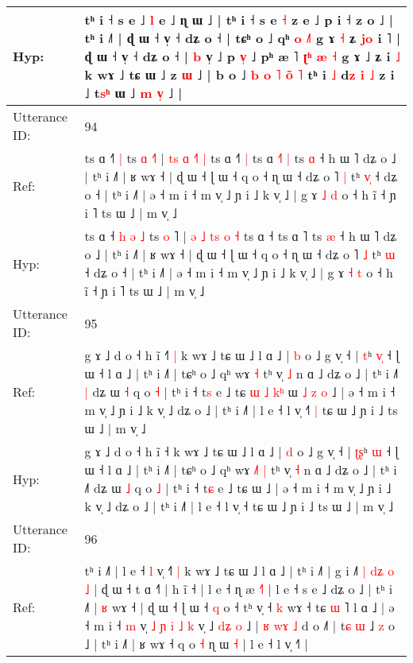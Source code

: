 \documentclass[10pt]{article}
\DeclareRobustCommand{\hl}[1]{{\textcolor{red}{#1}}}
\begin{document}
\begin{longtable}{ll}
 \\
Hyp: & tʰ i ˧ s e ˩ \hl{l} e ˩ ɳ ɯ ˩ | tʰ i ˧ s e \hl{˧} z e ˩\hl{}\hl{} p i ˧ z o ˩ | tʰ i ˩˥ | ɖ ɯ ˧ v̩ ˧ dʑ o ˧ | tɕʰ o ˩ qʰ \hl{}\hl{o} \hl{}\hl{˩}\hl{˥} g ɤ \hl{˧} ʑ\hl{ }\hl{j}\hl{o} i ˥ | ɖ ɯ ˧ v̩ ˧ dʑ o ˧ | \hl{b} v̩ ˩ p\hl{ }\hl{v}\hl{̩} ˩ pʰ æ ˥\hl{ }\hl{ʈ}\hl{ʰ}\hl{ }\hl{æ} \hl{˧} g ɤ ˩ ʑ i \hl{˩} k wɤ ˩ tɕ ɯ ˩ z \hl{ɯ} ˩ | b o ˩ \hl{b} \hl{o}\hl{ }\hl{˥} \hl{o}\hl{̃} \hl{˥} tʰ i \hl{˩} d\hl{z}\hl{ }\hl{i}\hl{ }\hl{˩}\hl{ }z i ˩ t\hl{s}\hl{ʰ} ɯ ˩ \hl{m} \hl{v}\hl{̩} ˩ |
 \\
\midrule
Utterance ID: & 94 \\
Ref: & ts ɑ ˧\hl{}\hl{}\hl{}\hl{˥} \hl{|} ts \hl{ɑ} \hl{˧}˥ | \hl{}\hl{t}\hl{s} \hl{ɑ}\hl{ }\hl{˧}\hl{˥} \hl{|} ts ɑ ˧\hl{˥}\hl{ }\hl{|} ts ɑ \hl{˧}˥\hl{ }\hl{|} ts \hl{ɑ} ˧ h ɯ ˥ dʑ o ˩ | tʰ i ˩˥ | ʁ wɤ ˧ | ɖ ɯ ˧ ɭ ɯ ˧ q o ˧ ɳ ɯ ˧ dʑ o ˥ \hl{|} tʰ \hl{v}\hl{̩} ˧ dʑ o ˧ | tʰ i ˩˥ | ə ˧ m i ˧ m v̩ ˩ ɲ i ˩ k v̩ ˩ | g ɤ \hl{˩} \hl{d} o ˧ h ĩ ˧ ɲ i ˥ ts ɯ ˩ | m v̩ ˩
 \\
Hyp: & ts ɑ ˧\hl{ }\hl{h}\hl{ }\hl{ə} \hl{˩} ts \hl{o} \hl{}˥ | \hl{ə}\hl{ }\hl{˩} \hl{t}\hl{s}\hl{ }\hl{o} \hl{˧} ts ɑ ˧\hl{}\hl{}\hl{} ts ɑ \hl{}˥\hl{}\hl{} ts \hl{æ} ˧ h ɯ ˥ dʑ o ˩ | tʰ i ˩˥ | ʁ wɤ ˧ | ɖ ɯ ˧ ɭ ɯ ˧ q o ˧ ɳ ɯ ˧ dʑ o ˥ \hl{˩} tʰ \hl{}\hl{ɯ} ˧ dʑ o ˧ | tʰ i ˩˥ | ə ˧ m i ˧ m v̩ ˩ ɲ i ˩ k v̩ ˩ | g ɤ \hl{˧} \hl{t} o ˧ h ĩ ˧ ɲ i ˥ ts ɯ ˩ | m v̩ ˩
 \\
\midrule
Utterance ID: & 95 \\
Ref: & g ɤ ˩ d o ˧ h ĩ ˧\hl{˥}\hl{ }\hl{|} k wɤ ˩ tɕ ɯ ˩ l ɑ ˩ | \hl{b} o ˩ g v̩ ˧ | \hl{}\hl{t}ʰ \hl{v}\hl{̩} ˧ ɭ ɯ ˧ l ɑ ˩ | tʰ i ˩˥ | tɕʰ o ˩ qʰ wɤ\hl{}\hl{}\hl{} \hl{˧} tʰ v̩ \hl{˩} n ɑ ˩ dʑ o ˩ | tʰ i ˩˥\hl{ }\hl{|} dʑ ɯ \hl{˧} q o \hl{˧} | tʰ i ˧ t\hl{s} e ˩ tɕ\hl{ }\hl{ɯ}\hl{ }\hl{˩}\hl{ }\hl{k}\hl{ʰ} ɯ\hl{ }\hl{˩}\hl{ }\hl{z}\hl{ }\hl{o} ˩ | ə ˧ m i ˧ m v̩ ˩ ɲ i ˩ k v̩ ˩ dʑ o ˩ | tʰ i ˩˥ | l e ˧ l v̩ ˧\hl{˥}\hl{ }\hl{|} tɕ ɯ ˩ ɲ i ˩ ts ɯ ˩ | m v̩ ˩
 \\
Hyp: & g ɤ ˩ d o ˧ h ĩ ˧\hl{}\hl{}\hl{} k wɤ ˩ tɕ ɯ ˩ l ɑ ˩ | \hl{d} o ˩ g v̩ ˧ | \hl{ʈ}\hl{ʂ}ʰ \hl{}\hl{ɯ} ˧ ɭ ɯ ˧ l ɑ ˩ | tʰ i ˩˥ | tɕʰ o ˩ qʰ wɤ\hl{ }\hl{˩}\hl{˥} \hl{|} tʰ v̩ \hl{˧} n ɑ ˩ dʑ o ˩ | tʰ i ˩˥\hl{}\hl{} dʑ ɯ \hl{˩} q o \hl{˩} | tʰ i ˧ t\hl{ɕ} e ˩ tɕ\hl{}\hl{}\hl{}\hl{}\hl{}\hl{}\hl{} ɯ\hl{}\hl{}\hl{}\hl{}\hl{}\hl{} ˩ | ə ˧ m i ˧ m v̩ ˩ ɲ i ˩ k v̩ ˩ dʑ o ˩ | tʰ i ˩˥ | l e ˧ l v̩ ˧\hl{}\hl{}\hl{} tɕ ɯ ˩ ɲ i ˩ ts ɯ ˩ | m v̩ ˩
 \\
\midrule
Utterance ID: & 96 \\
Ref: & tʰ i ˩˥ | l e ˧\hl{ }\hl{l} v̩ ˧\hl{˥}\hl{ }\hl{|} k wɤ ˩ tɕ ɯ ˩ l ɑ ˩ | tʰ i ˩˥ | g i ˩˥\hl{ }\hl{|}\hl{ }\hl{d}\hl{ʑ}\hl{ }\hl{o} \hl{˩} | ɖ ɯ ˧ t ɑ ˧˥ | h ĩ ˧ | l e ˧ ɳ æ \hl{˧}˥ | l e ˧ s e ˩ dʑ o ˩ | tʰ i ˩˥ |\hl{ }\hl{ʁ} wɤ ˧ | ɖ ɯ ˧ ɭ ɯ ˧\hl{}\hl{}\hl{}\hl{} \hl{q} o ˧ tʰ v̩ ˧ \hl{k} wɤ ˧ tɕ \hl{ɯ} ˥ l ɑ ˩ | ə ˧ m i ˧ \hl{m} v̩\hl{ }\hl{˩}\hl{ }\hl{ɲ} \hl{i} \hl{˩}\hl{ }\hl{k} v̩ ˩ \hl{d}\hl{ʑ} \hl{o} ˩ | \hl{ʁ} \hl{}\hl{w}\hl{ɤ} \hl{˩} d o ˩\hl{}˥ | t\hl{ɕ} \hl{ɯ} ˩ \hl{z} o ˩ | tʰ i ˩˥ | ʁ wɤ ˧ q o \hl{˧} ɳ ɯ \hl{˧} | l e ˧ l v̩ ˧\hl{˥} |

\end{longtable}
\end{document}
